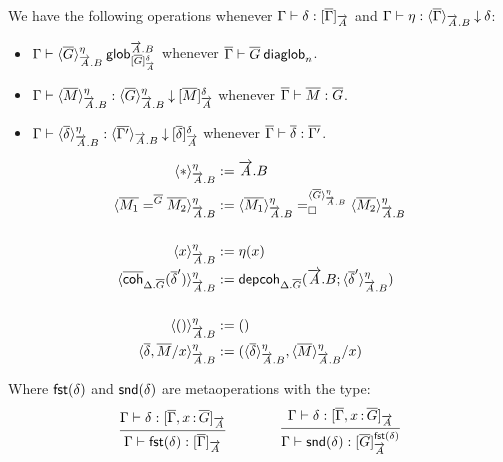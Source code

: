 We have the following operations whenever
$\ofinterp{\Gamma}{\delta}{\diag\Gamma}{\tel A}$ and
$\ofinterpdep{\Gamma}{\eta}{\diag\Gamma}{\tel A.B}{\delta}$:

\begin{itemize}
\item
$\wfdepglob{\Gamma}{\interpdepglob{\diag G}{\tel A.B}{\eta}}{\tel A.B}
  {\interpglob{\diag G}{\tel A}{\delta}}$
whenever
$\wfdiaglob{\diag\Gamma}{\diag G}n$.

\item
$\ofdepglob{\Gamma}{\interpdepglob{\diag M}{\tel A.B}{\eta}}
 {\interpdepglob{\diag G}{\tel A.B}{\eta}}
 {\interpglob{\diag M}{\tel A}{\delta}}$
whenever
$\ofdiaglob{\diag\Gamma}{\diag M}{\diag G}$.

\item
$\ofinterpdep{\Gamma}
  {\interpdepglob{\diag\delta}{\tel A.B}{\eta}}{\diag{\Gamma'}}{\tel A.B}
  {\interpglob{\diag\delta}{\tel A}{\delta}}$
whenever
$\ofdiaglob{\diag\Gamma}{\diag\delta}{\diag{\Gamma'}}$.
\end{itemize}

\[\begin{aligned}
\interpdepglob{\diagbase}{\tel A.B}{\eta} & := \tel A.B \\
\interpdepglob{\homj{\diag G}{\diag{M_1}}{\diag{M_2}}}
  {\tel A.B}{\eta} & :=
\dhomj
  {\interpdepglob{\diag G}{\tel A.B}{\eta}}
  {\interpdepglob{\diag{M_1}}{\tel A.B}{\eta}}
  {\interpdepglob{\diag{M_2}}{\tel A.B}{\eta}}
  {\blank} \\
&\\
\interpdepglob{x}{\tel A.B}{\eta} & := \eta(x) \\
\interpdepglob
  {\diagcoh{\Delta.\diag{G}}{\diag \delta'}}{\tel A.B}{\eta} & :=
\depcoh{\Delta.\diag G}{\tel A.B}
  {\interpdepglob{\diag\delta'}{\tel A.B}{\eta}} \\
&\\
\interpdepglob{()}{\tel A.B}{\eta} & := () \\
\interpdepglob{\diag\delta,\diag M/x}{\tel A.B}{\eta} & :=
(\interpdepglob{\diag\delta}{\tel A.B}{\eta},\interpdepglob{\diag
M}{\tel A.B}{\eta}/x)
\end{aligned}\]

Where $\fstinterp{\delta}$ and $\sndinterp{\delta}$ are metaoperations with the
type:
\[
\infer
  {\ofinterp{\Gamma}{\fstinterp\delta}{\diag\Gamma}{\tel A}}
  {\ofinterp{\Gamma}{\delta}{\diag\Gamma,\tptm{x}{\diag G}}{\tel A}}
\qquad\qquad
\infer
  {\ofglob{\Gamma}{\sndinterp\delta}
   {\interpglob{\diag G}{\tel A}{\fstinterp\delta}}}
  {\ofinterp{\Gamma}{\delta}{\diag\Gamma,\tptm{x}{\diag G}}{\tel A}}
\]

